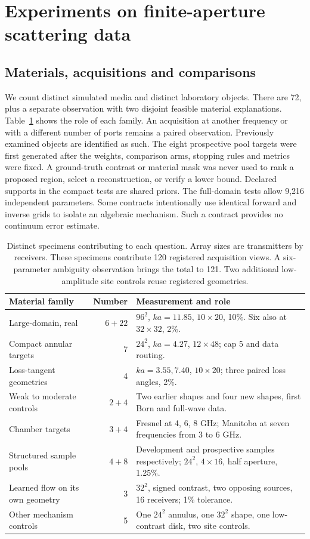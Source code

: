 \section{Experiments on finite-aperture scattering data}\label{sec:experiments}
\subsection{Materials, acquisitions and comparisons}
We count distinct simulated media and distinct laboratory objects. There are 72, plus a separate observation with two disjoint feasible material explanations. Table~\ref{tab:cohort} shows the role of each family. An acquisition at another frequency or with a different number of ports remains a paired observation. Previously examined objects are identified as such. The eight prospective pool targets were first generated after the weights, comparison arms, stopping rules and metrics were fixed. A ground-truth contrast or material mask was never used to rank a proposed region, select a reconstruction, or verify a lower bound. Declared supports in the compact tests are shared priors. The full-domain tests allow 9,216 independent parameters. Some contracts intentionally use identical forward and inverse grids to isolate an algebraic mechanism. Such a contract provides no continuum error estimate.

\begin{table}[!htbp]\centering\small
\caption{Distinct specimens contributing to each question. Array sizes are transmitters by receivers. These specimens contribute 120 registered acquisition views. A six-parameter ambiguity observation brings the total to 121. Two additional low-amplitude site controls reuse registered geometries.}\label{tab:cohort}
\begin{tabular}{@{}p{.33\linewidth}rp{.48\linewidth}@{}}\toprule
Material family & Number & Measurement and role\\\midrule
Large-domain, real & $6+22$ & $96^2$, $ka=11.85$, $10\times20$, 10\%. Six also at $32\times32$, 2\%.\\
Compact annular targets & 7 & $24^2$, $ka=4.27$, $12\times48$; cap 5 and data routing.\\
Loss-tangent geometries & 4 & $ka=3.55,7.40$, $10\times20$; three paired loss angles, 2\%.\\
Weak to moderate controls & $2+4$ & Two earlier shapes and four new shapes, first Born and full-wave data.\\
Chamber targets & $3+4$ & Fresnel at 4, 6, 8 GHz; Manitoba at seven frequencies from 3 to 6 GHz.\\
Structured sample pools & $4+8$ & Development and prospective samples respectively; $24^2$, $4\times16$, half aperture, 1.25\%.\\
Learned flow on its own geometry & 3 & $32^2$, signed contrast, two opposing sources, 16 receivers; 1\% tolerance.\\
Other mechanism controls & 5 & One $24^2$ annulus, one $32^2$ shape, one low-contrast disk, two site controls.\\\bottomrule
\end{tabular}
\end{table}

